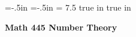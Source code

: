 \def\cmb{\MidnightBlue}	  %
\def\cnb{\NavyBlue}	  %
\def\crb{\RoyalBlue}	  %
\def\cce{\Cerulean}	  %
\def\ccy{\Cyan}		  %
\def\cpb{\ProcessBlue}	  %
\def\csb{\SkyBlue}	  %
\def\ctu{\Turquoise}	  %
\def\ctb{\TealBlue}	  %
\def\caq{\Aquamarine}	  %
\def\cbg{\BlueGreen}	  %
\def\cem{\Emerald}	  %
\def\cjg{\JungleGreen}	  %
\def\csg{\SeaGreen}	  %
\def\cgg{\Green}	  %
\def\cfg{\ForestGreen}	  %
\def\cpg{\PineGreen}	  %
\def\clg{\LimeGreen}	  %
\def\cyg{\YellowGreen}	  %
\def\cspg{\SpringGreen}	  %
\def\cog{\OliveGreen}	  %
\def\pars{\RawSienna}	  %
\def\cse{\Sepia}		  %
\def\cbr{\Brown}		  %
\def\cta{\Tan}		  %
\def\cgr{\Gray}		  %
\def\cbl{\Black}		  %
\def\cwh{\White}		  %


\voffset=-.5in
\hoffset=-.5in
\hsize = 7.5 true in
 true in


\overfullrule=0pt


\def\ctln{\centerline}
\def\u{\underbar}
\def\ssk{\smallskip}
\def\msk{\medskip}
\def\bsk{\bigskip}
\def\hsk{\hskip.1in}
\def\hhsk{\hskip.2in}
\def\dsl{\displaystyle}
\def\hskp{\hskip1.5in}

\def\moda{\medspace {\underset a\to \equiv} \medspace}
\def\modb{\medspace {\underset b\to \equiv} \medspace}
\def\modc{\medspace {\underset c\to \equiv} \medspace}

\def\lra{$\Leftrightarrow$ }


\ctln{\bf Math 445 Number Theory}

